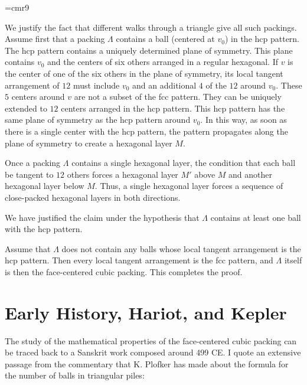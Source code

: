 {

\narrower

\font\ninerm=cmr9 \ninerm

\def\=#1{\accent"16 #1}


We justify the fact that different walks through a triangle give
all such packings. Assume first that a packing $\Lambda$ contains
a ball (centered at $v_0$) in the hcp pattern. The hcp pattern
contains a uniquely determined plane of symmetry. This plane
contains $v_0$ and the centers of six others arranged in a regular
hexagonal. If $v$ is the center of one of the six others in the
plane of symmetry, its local tangent arrangement of $12$ must
include $v_0$ and an additional $4$ of the $12$ around $v_0$.
These $5$ centers around $v$ are not a subset of the fcc pattern.
They can be uniquely extended to $12$ centers arranged in the hcp
pattern. This hcp pattern has the same plane of symmetry as the
hcp pattern around $v_0$. In this way, as soon as there is a
single center with the hcp pattern, the pattern propagates along
the plane of symmetry to create a hexagonal layer $M$.

Once a packing $\Lambda$ contains a single hexagonal layer, the
condition that each ball be tangent to $12$ others forces a
hexagonal layer $M'$ above $M$ and another hexagonal layer below
$M$.  Thus, a single hexagonal layer forces a sequence of
close-packed hexagonal layers in both directions.

We have justified the claim under the hypothesis that $\Lambda$
contains at least one ball with the hcp pattern.

Assume that $\Lambda$ does not contain any balls whose local
tangent arrangement is the hcp pattern.  Then every local tangent
arrangement is the fcc pattern, and $\Lambda$ itself is then the
face-centered cubic packing.  This completes the proof.


}

\section{Early History, Hariot, and Kepler}
\label{sec:early}

The study of the mathematical properties of the face-centered cubic
packing can be traced back to a Sanskrit work composed around 499 CE.
I quote an extensive passage from the commentary that K. Plofker
has made about the formula
for the number of balls in triangular piles\cite{Plo00}:
\medskip

